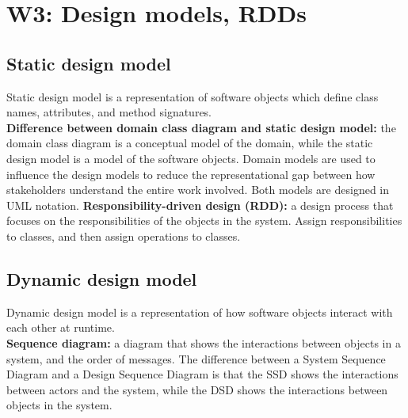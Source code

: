 \section{W3: Design models, RDDs}

\subsection{Static design model}
Static design model is a representation of software objects which define class names, attributes, and method signatures.\\
\textbf{Difference between domain class diagram and static design model:} the domain class diagram is a conceptual model of the domain, while the static design model is a model of the software objects. Domain models are used to influence the design models to reduce the representational gap between how stakeholders understand the entire work involved. Both models are designed in UML notation.
\textbf{Responsibility-driven design (RDD):} a design process that focuses on the responsibilities of the objects in the system. Assign responsibilities to classes, and then assign operations to classes.\\

\subsection{Dynamic design model}
Dynamic design model is a representation of how software objects interact with each other at runtime.\\
\textbf{Sequence diagram:} a diagram that shows the interactions between objects in a system, and the order of messages. The difference between a System Sequence Diagram and a Design Sequence Diagram is that the SSD shows the interactions between actors and the system, while the DSD shows the interactions between objects in the system.\\
